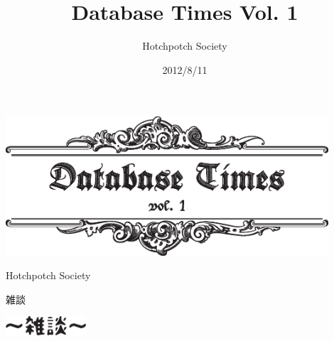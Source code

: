 \documentclass[b5paper,papersize,tombow,12pt]{jsbook}
\title{Database Times Vol. 1}
\date{2012/8/11}
\author{Hotchpotch Society}
\begin{document}
\thispagestyle{empty}

\frontmatter

\begin{center}
 \includegraphics[width=12cm]{hayamiz/images/title.eps}
 \par\vspace*{50mm}
 \noindent Hotchpotch Society
\end{center}



\setcounter{tocdepth}{0} %
\tableofcontents

\mainmatter

\pagestyle{fancy}









\cleardoublepage
\plainifnotempty
{}
{\protect 雑談}

\begin{center}
 \includegraphics[width=3cm]{images/zatsudan.eps}
\end{center}

%
%

\footnotesize
\end{document}

